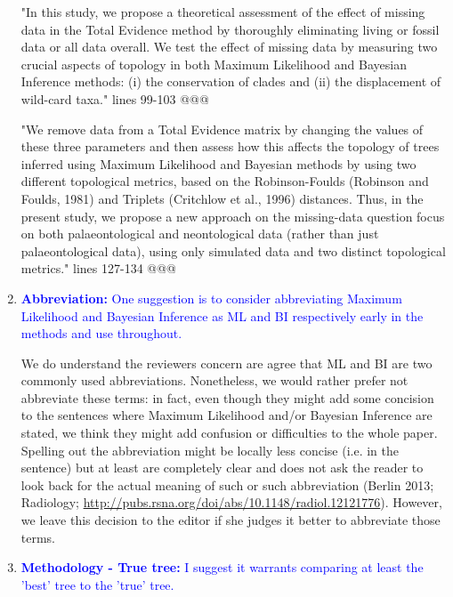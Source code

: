 \documentclass[12pt,letterpaper]{article}
\begin{document}
\begin{enumerate}
"In this study, we propose a theoretical assessment of the effect of missing data in the Total Evidence method by thoroughly eliminating living or fossil data or all data overall.
We test the effect of missing data by measuring two crucial aspects of topology in both Maximum Likelihood and Bayesian Inference methods: (i) the conservation of clades and (ii) the displacement of wild-card taxa." lines 99-103 @@@

"We remove data from a Total Evidence matrix by changing the values of these three parameters and then assess how this affects the topology of trees inferred using Maximum Likelihood and Bayesian methods by using two different topological metrics, based on the Robinson-Foulds (Robinson and Foulds, 1981) and Triplets (Critchlow et al., 1996) distances.
Thus, in the present study, we propose a new approach on the missing-data question focus on both palaeontological and neontological data (rather than just palaeontological data), using only simulated data and two distinct topological metrics." lines 127-134 @@@

\item{\textcolor{blue}{\textbf{Abbreviation:} One suggestion is to consider abbreviating Maximum Likelihood and Bayesian Inference as ML and BI respectively early in the methods and use throughout.}}

We do understand the reviewers concern are agree that ML and BI are two commonly used abbreviations.
Nonetheless, we would rather prefer not abbreviate these terms: in fact, even though they might add some concision to the sentences where Maximum Likelihood and/or Bayesian Inference are stated, we think they might add confusion or difficulties to the whole paper.
Spelling out the abbreviation might be locally less concise (i.e. in the sentence) but at least are completely clear and does not ask the reader to look back for the actual meaning of such or such abbreviation (Berlin 2013; Radiology; \url{http://pubs.rsna.org/doi/abs/10.1148/radiol.12121776}).
However, we leave this decision to the editor if she judges it better to abbreviate those terms. %


\item{\textcolor{blue}{\textbf{Methodology - True tree:} I suggest it warrants comparing at least the 'best' tree to the 'true' tree.}}


\end{enumerate}
\end{document}
